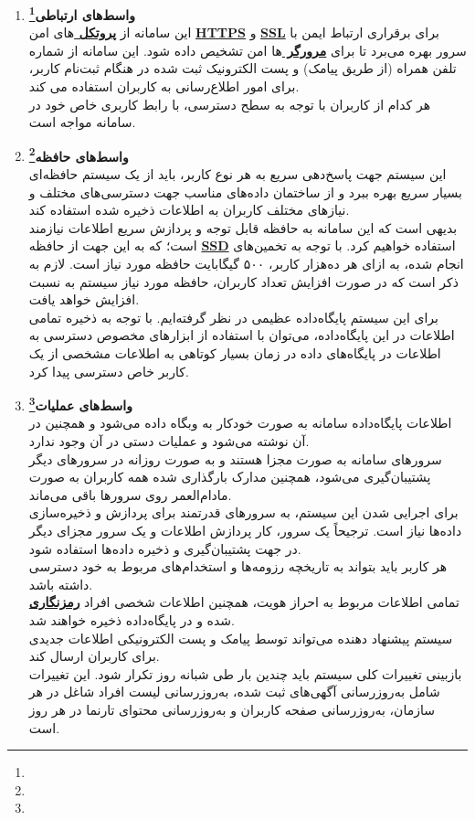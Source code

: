 \documentclass[12pt]{article}
\begin{document}
\begin{enumerate}
		\item
		\textbf{واسط‌های ارتباطی\footnote{}}\\
		این سامانه از \textbf{\hyperref[ref:protocol]{پروتکل }} های امن \textbf{\hyperref[ref:https]{HTTPS}} و \textbf{\hyperref[ref:ssl]{SSL}} برای برقراری ارتباط ایمن با سرور بهره می‌برد تا برای \textbf{\hyperref[ref:browser]{مرورگر }}ها امن تشخیص داده شود. این سامانه از شماره تلفن همراه (از طریق پیامک) و پست الکترونیک ثبت شده در هنگام ثبت‌نام کاربر، برای امور اطلاع‌‌رسانی به کاربران استفاده می کند.\\
		هر کدام از کاربران با توجه به سطح دسترسی، با رابط کاربری خاص خود در سامانه مواجه است.

		\item
		\textbf{واسط‌های حافظه\footnote{}}\\
		این سیستم جهت پاسخ‌دهی سریع به هر نوع کاربر، باید از یک سیستم حافظه‌ای بسیار سریع بهره ببرد و از ساختمان داده‌های مناسب جهت دسترسی‌های مختلف و نیازهای مختلف کاربران به اطلاعات ذخیره شده استفاده کند.\\
		بدیهی است که این سامانه به حافظه قابل توجه و پردازش سريع اطلاعات نیازمند است؛ که به این جهت از حافظه \textbf{\hyperref[ref:ssd]{SSD}} استفاده خواهیم کرد. با توجه به تخمین‌های انجام شده، به ازای هر ده‌هزار کاربر، ۵۰۰ گیگابایت حافظه مورد نیاز است. لازم به ذکر است که در صورت افزایش تعداد کاربران، حافظه‌ مورد نیاز سیستم به نسبت افزایش خواهد یافت.\\
		برای این سیستم پایگاه‌داده عظیمی در نظر گرفته‌ایم. با توجه به ذخیره تمامی اطلاعات در این پایگاه‌‌داده، می‌توان با استفاده از ابزار‌های مخصوص دسترسی به اطلاعات در پایگاه‌های داده در زمان بسیار کوتاهی به اطلاعات مشخصی از یک کاربر خاص دسترسی پیدا کرد.
		\item
		\textbf{واسط‌های عملیات\footnote{}}\\
		اطلاعات پایگاه‌داده سامانه به صورت خودکار به وبگاه داده می‌شود و همچنین در آن نوشته می‌شود و عملیات دستی در آن وجود ندارد.\\
		سرورهای سامانه به صورت مجزا هستند و به صورت روزانه در سرورهای دیگر پشتیبان‌گیری می‌شود، همچنین مدارک بارگذاری شده همه کاربران به صورت مادام‌العمر روی سرور‌ها باقی می‌ماند.\\
		برای اجرایی شدن این سیستم، به سرورهای قدرتمند برای پردازش و ذخیره‌سازی داده‌ها نیاز است. ترجیحاً یک سرور، کار پردازش اطلاعات و یک سرور مجزای دیگر در جهت پشتیبان‌گیری و ذخیره داده‌ها استفاده شود.\\
		هر کاربر باید بتواند به تاریخچه رزومه‌ها و استخدام‌های مربوط به خود دسترسی داشته باشد.\\
		تمامی اطلاعات مربوط به احراز هویت، همچنین اطلاعات شخصی افراد \textbf{\hyperref[ref:enc]{رمزنگاری}} شده و در پایگاه‌داده ذخیره خواهند شد.\\
		سیستم پیشنهاد دهنده می‌تواند توسط پیامک و پست الکترونیکی اطلاعات جدیدی برای کاربران ارسال کند.\\
		بازبینی تغییرات کلی سیستم باید چندین بار طی شبانه روز تکرار شود. این تغییرات شامل به‌روزرسانی آگهی‌های ثبت شده، به‌روزرسانی لیست افراد شاغل در هر سازمان، به‌روزرسانی صفحه کاربران و به‌روزرسانی محتوای تارنما در هر روز است.


\end{enumerate}
\end{document}
